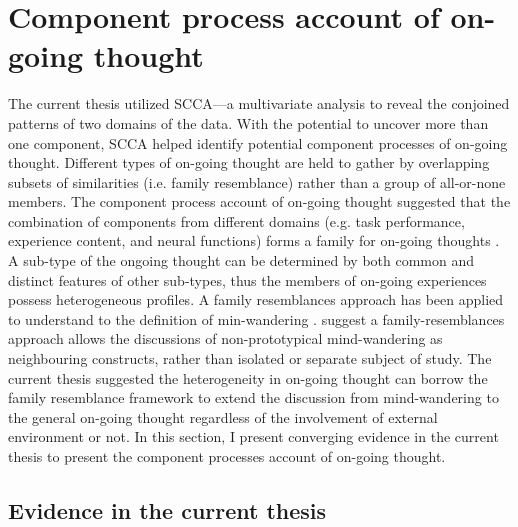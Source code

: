 
\section{Component process account of on-going thought}
\label{ch:discussion:components}
The current thesis utilized SCCA---a multivariate analysis to reveal the conjoined patterns of two domains of the data. With the potential to uncover more than one component, SCCA helped identify potential component processes of on-going thought. Different types of on-going thought are held to gather by overlapping subsets of similarities (i.e. family resemblance) rather than a group of all-or-none members. The component process account of on-going thought \cite{SmallwoodSchooler2015} suggested that the combination of components from different domains (e.g. task performance, experience content, and neural functions) forms a family for on-going thoughts \cite{Seli2018}. A sub-type of the ongoing thought can be determined by both common and distinct features of other sub-types, thus the members of on-going experiences possess heterogeneous profiles. A family resemblances approach has been applied to understand to the definition of min-wandering \cite{Seli2018}.  suggest a family-resemblances approach allows the discussions of non-prototypical mind-wandering as neighbouring constructs, rather than isolated or separate subject of study. The current thesis suggested the heterogeneity in on-going thought can borrow the family resemblance framework to extend the discussion from mind-wandering to the general on-going thought regardless of the involvement of external environment or not. In this section, I present converging evidence in the current thesis to present the component processes account of on-going thought. 

\subsection{Evidence in the current thesis}



